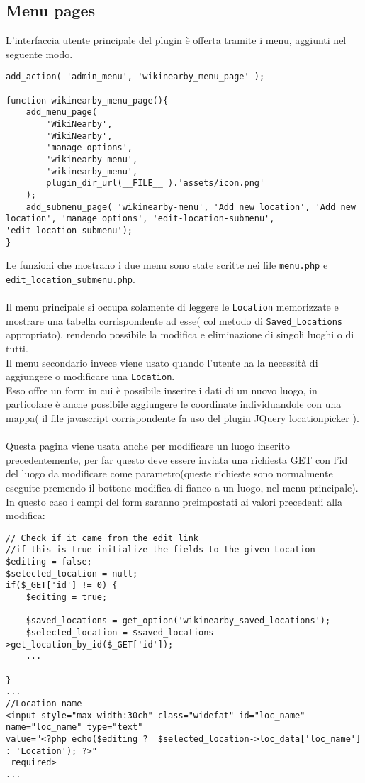 \subsection*{Menu pages}
L'interfaccia utente principale del plugin è offerta tramite i  menu\cite{menus}, aggiunti nel seguente modo.\\
\begin{lstlisting}
add_action( 'admin_menu', 'wikinearby_menu_page' );

function wikinearby_menu_page(){
    add_menu_page(
        'WikiNearby',
        'WikiNearby',
        'manage_options',
        'wikinearby-menu',
        'wikinearby_menu',
		plugin_dir_url(__FILE__ ).'assets/icon.png'
    );
    add_submenu_page( 'wikinearby-menu', 'Add new location', 'Add new location', 'manage_options', 'edit-location-submenu', 'edit_location_submenu');
}
\end{lstlisting}
Le funzioni che mostrano i due menu sono state scritte nei file \texttt{menu.php} e \\ \texttt{edit\_location\_submenu.php}.\\ \\
Il menu principale si occupa solamente di leggere le \texttt{Location} memorizzate e mostrare una tabella corrispondente ad esse( col metodo di \texttt{Saved\_Locations} appropriato), rendendo possibile la modifica e eliminazione di singoli luoghi o di tutti.\\
Il menu secondario invece viene usato quando l'utente ha la necessità di aggiungere o modificare una \texttt{Location}.\\
Esso offre un form in cui è possibile inserire i dati di un nuovo luogo, in particolare è anche possibile aggiungere le coordinate individuandole con una mappa( il file javascript corrispondente fa uso del plugin JQuery locationpicker \cite{locpicker}).\\\\
Questa pagina viene usata anche per modificare un luogo inserito precedentemente, per far questo deve essere inviata una richiesta GET con l'id del luogo da modificare come parametro(queste richieste sono normalmente eseguite premendo il bottone modifica di fianco a un luogo, nel menu principale).\\
In questo caso i campi del form saranno preimpostati ai valori precedenti alla modifica:

\begin{lstlisting}
// Check if it came from the edit link
//if this is true initialize the fields to the given Location
$editing = false;
$selected_location = null;
if($_GET['id'] != 0) {
	$editing = true;
		
	$saved_locations = get_option('wikinearby_saved_locations');
	$selected_location = $saved_locations->get_location_by_id($_GET['id']);
	...
		
}
...
//Location name
<input style="max-width:30ch" class="widefat" id="loc_name" name="loc_name" type="text" 
value="<?php echo($editing ?  $selected_location->loc_data['loc_name'] : 'Location'); ?>"
 required>
...
\end{lstlisting}
